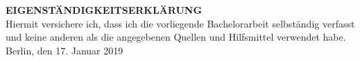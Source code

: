 \textbf{EIGENSTÄNDIGKEITSERKLÄRUNG}\\
Hiermit versichere ich, dass ich die vorliegende Bachelorarbeit selbständig verfasst und keine anderen als die angegebenen Quellen und Hilfsmittel verwendet habe.\\
Berlin, den 17. Januar 2019